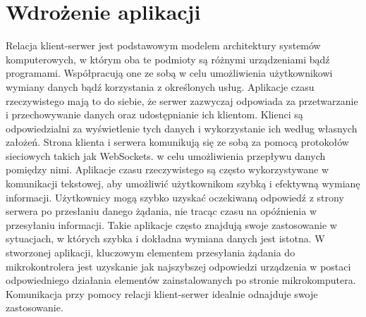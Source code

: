 \section{Wdrożenie aplikacji}
Relacja klient-serwer jest podstawowym modelem architektury systemów komputerowych, w którym oba te podmioty są różnymi urządzeniami bądź programami. Współpracują one ze sobą w celu umożliwienia użytkownikowi wymiany danych bądź korzystania z określonych usług. Aplikacje czasu rzeczywistego mają to do siebie, że serwer zazwyczaj odpowiada za przetwarzanie i przechowywanie danych oraz udostępnianie ich klientom. Klienci są odpowiedzialni za wyświetlenie tych danych i wykorzystanie ich według własnych założeń. Strona klienta i serwera komunikują się ze sobą za pomocą protokołów sieciowych takich jak WebSockets. w celu umożliwienia przepływu danych pomiędzy nimi. Aplikacje czasu rzeczywistego są często wykorzystywane w komunikacji tekstowej, aby umożliwić użytkownikom szybką i efektywną wymianę informacji. Użytkownicy mogą szybko uzyskać oczekiwaną odpowiedź z strony serwera po przesłaniu danego żądania, nie tracąc czasu na opóźnienia w przesyłaniu informacji. Takie aplikacje często znajdują swoje zastosowanie w sytuacjach, w których szybka i dokładna wymiana danych jest istotna. W stworzonej aplikacji, kluczowym elementem przesyłania żądania do mikrokontrolera jest uzyskanie jak najszybszej odpowiedzi urządzenia w postaci odpowiedniego działania elementów zainstalowanych po stronie mikrokomputera. Komunikacja przy pomocy relacji klient-serwer idealnie odnajduje swoje zastosowanie.
\newpage
